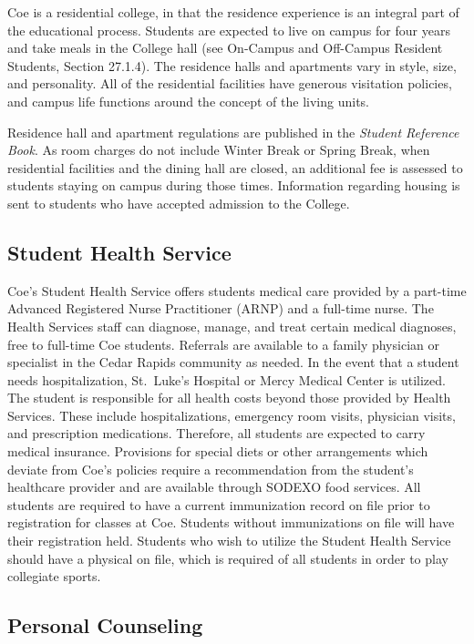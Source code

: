 \documentclass[
  letterpaper,
]{scrbook}
\begin{document}
Coe is a residential college, in that the residence experience is an
integral part of the educational process. Students are expected to live
on campus for four years and take meals in the College hall (see
On-Campus and Off-Campus Resident Students, Section 27.1.4). The
residence halls and apartments vary in style, size, and personality. All
of the residential facilities have generous visitation policies, and
campus life functions around the concept of the living units.

Residence hall and apartment regulations are published in the
\emph{Student Reference Book}. As room charges do not include Winter
Break or Spring Break, when residential facilities and the dining hall
are closed, an additional fee is assessed to students staying on campus
during those times. Information regarding housing is sent to students
who have accepted admission to the College.

\subsection{Student Health Service}\label{student-health-service}

Coe's Student Health Service offers students medical care provided by a
part-time Advanced Registered Nurse Practitioner (ARNP) and a full-time
nurse. The Health Services staff can diagnose, manage, and treat certain
medical diagnoses, free to full-time Coe students. Referrals are
available to a family physician or specialist in the Cedar Rapids
community as needed. In the event that a student needs hospitalization,
St.~Luke's Hospital or Mercy Medical Center is utilized. The student is
responsible for all health costs beyond those provided by Health
Services. These include hospitalizations, emergency room visits,
physician visits, and prescription medications. Therefore, all students
are expected to carry medical insurance. Provisions for special diets or
other arrangements which deviate from Coe's policies require a
recommendation from the student's healthcare provider and are available
through SODEXO food services. All students are required to have a
current immunization record on file prior to registration for classes at
Coe. Students without immunizations on file will have their registration
held. Students who wish to utilize the Student Health Service should
have a physical on file, which is required of all students in order to
play collegiate sports.

\subsection{Personal Counseling}\label{personal-counseling}
\end{document}
